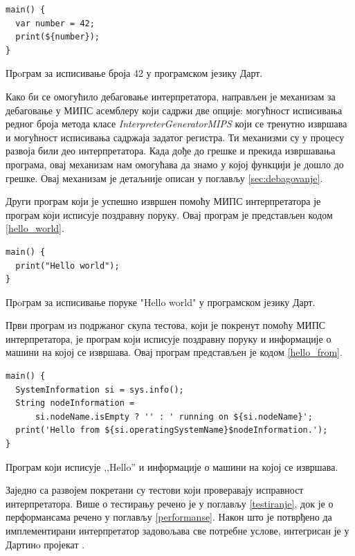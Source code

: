 \documentclass[12pt,oneside]{memoir}
\begin{document}
\begin{listing}
\begin{verbatim}
main() {
  var number = 42;
  print(${number});
}
\end{verbatim}
\caption{Прoграм за исписивање броја 42 у програмском језику Дарт.}
\label{return_42}
\end{listing}

Како би се омогућило дебаговање интерпретатора, направљен је механизам за дебаговање у МИПС асемблеру који садржи две опције: могућност исписивања редног броја метода класе \textit{InterpreterGeneratorMIPS} који се тренутно извршава и могућност исписивања садржаја задатог регистра. Ти механизми су у процесу развоја били део интерпретатора. Када дође до грешке и прекида извршавања програма, овај механизам нам омогућава да знамо у којој функцији је дошло до грешке. Овај механизам је детаљније описан у поглављу \ref{sec:debagovanje}.

Други програм који је успешно извршен помоћу МИПС интерпретатора је програм који исписује поздравну поруку. Овај програм је представљен кодом \ref{hello_world}.

\begin{listing}
\begin{verbatim}
main() {
  print("Hello world");
}
\end{verbatim}
\caption{Прoграм за исписивање поруке "Hello world" у програмском језику Дарт.}
\label{hello_world}
\end{listing}

Први програм из подржаног скупа тестова, који је покренут помоћу МИПС интерпретатора, је  програм који исписује поздравну поруку и информације о машини на којој се извршава. Овај програм представљен је кодом \ref{hello_from}.

\begin{listing}
\begin{verbatim}
main() {
  SystemInformation si = sys.info();
  String nodeInformation =
      si.nodeName.isEmpty ? '' : ' running on ${si.nodeName}';
  print('Hello from ${si.operatingSystemName}$nodeInformation.');
}
\end{verbatim}
\caption{Програм који исписује ,,Hello'' и информације о машини на којој се извршава.}
\label{hello_from}
\end{listing}

Заједно са развојем покретани су тестови који проверавају исправност интерпретатора. Више о тестирању речено је у поглављу \ref{testiranje}, док је о перформансама речено у поглављу \ref{performanse}. Након што је потврђено да имплементирани интерпретатор задовољава све потребне услове, интегрисан је у Дартинo пројекат \cite{interpreterMips}.
\end{document}

